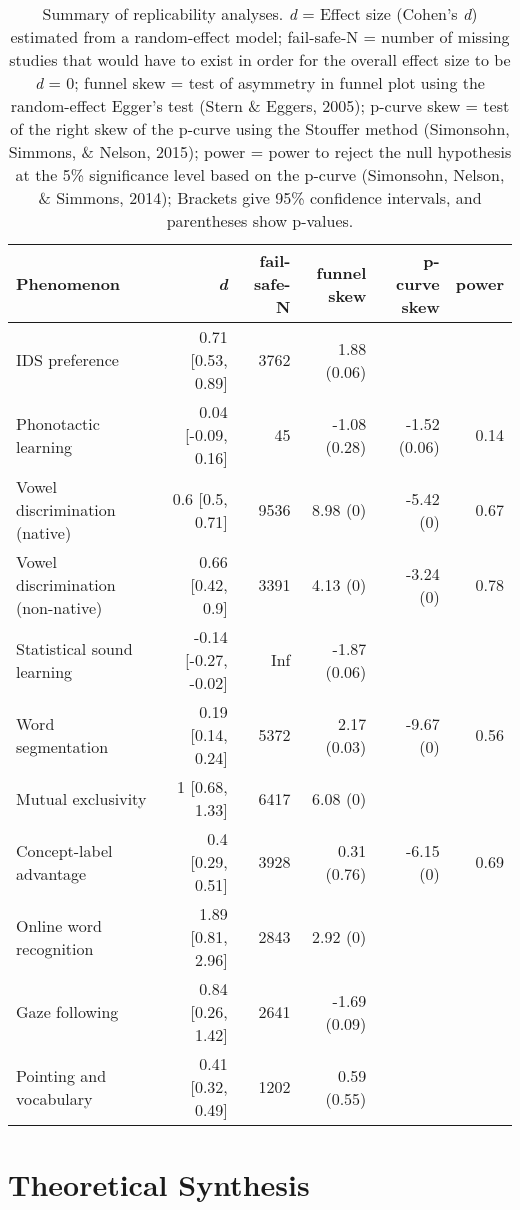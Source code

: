\documentclass[american,floatsintext,man]{apa6}
\begin{document}
\begin{table}[t]
\footnotesize
\begin{tabular}{lrrrrr}
\toprule
\textbf{Phenomenon}& \textbf{\textit{d}} & \textbf{fail-safe-N} & \textbf{funnel skew} & \textbf{p-curve skew} & \textbf{power}\\
\midrule
IDS preference & 0.71 [0.53, 0.89] & 3762 & 1.88 (0.06) &  & \\
Phonotactic learning & 0.04 [-0.09, 0.16] & 45 & -1.08 (0.28) & -1.52 (0.06) & 0.14\\
Vowel discrimination (native) & 0.6 [0.5, 0.71] & 9536 & 8.98 (0) & -5.42 (0) & 0.67\\
Vowel discrimination (non-native) & 0.66 [0.42, 0.9] & 3391 & 4.13 (0) & -3.24 (0) & 0.78\\
Statistical sound learning & -0.14 [-0.27, -0.02] & Inf & -1.87 (0.06) &  & \\
Word segmentation & 0.19 [0.14, 0.24] & 5372 & 2.17 (0.03) & -9.67 (0) & 0.56\\
Mutual exclusivity & 1 [0.68, 1.33] & 6417 & 6.08 (0) &  & \\
Concept-label advantage & 0.4 [0.29, 0.51] & 3928 & 0.31 (0.76) & -6.15 (0) & 0.69\\
Online word recognition & 1.89 [0.81, 2.96] & 2843 & 2.92 (0) &  & \\
Gaze following & 0.84 [0.26, 1.42] & 2641 & -1.69 (0.09) &  & \\
Pointing and vocabulary & 0.41 [0.32, 0.49] & 1202 & 0.59 (0.55) &  & \\
\bottomrule
\end{tabular}
\caption{Summary of replicability analyses. \textit{d} = Effect size (Cohen's {\it d}) estimated from a random-effect model; fail-safe-N = number of missing studies that would have to exist in order for the overall effect size to be {\it d} = 0; funnel skew = test of asymmetry in funnel plot using the random-effect Egger's test (Stern \& Eggers, 2005); p-curve skew = test of the right skew of the p-curve using the Stouffer method (Simonsohn, Simmons, \& Nelson, 2015); power = power to reject the null hypothesis at the 5\% significance level based on the p-curve (Simonsohn, Nelson, \& Simmons, 2014);  Brackets give 95\% confidence intervals, and parentheses show p-values.}
\end{table}

\section{Theoretical Synthesis}\label{theoretical-synthesis}
\end{document}

